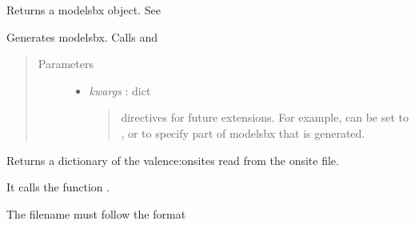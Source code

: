 \documentclass[letterpaper,10pt,english]{sphinxmanual}
\begin{document}
\begin{fulllineitems}
\begin{fulllineitems}
\begin{quote}
\begin{description}
\begin{itemize}
\end{itemize}

\end{description}\end{quote}

\end{fulllineitems}


\begin{fulllineitems}
\label{classes:catparam.CATParam.gen_modelsbx}
Returns a modelsbx object. See {\hyperref[classes:bopmodel.modelsbx]{}}

Generates modelsbx. Calls  and 
\begin{quote}\begin{description}
\item[{Parameters}] \leavevmode\begin{itemize}
\item {} 
\emph{kwargs} : dict
\begin{quote}

directives for future extensions. For example,  can be 
set to ,  or  to specify part of modelsbx that 
is generated.
\end{quote}

\end{itemize}

\end{description}\end{quote}

\end{fulllineitems}


\begin{fulllineitems}
\label{classes:catparam.CATParam.gen_onsite}
Returns a dictionary of the valence:onsites read from the onsite file.

It calls the function .

The filename must follow the format
\begin{quote}

\end{quote}


\end{fulllineitems}
\end{fulllineitems}
\end{document}
